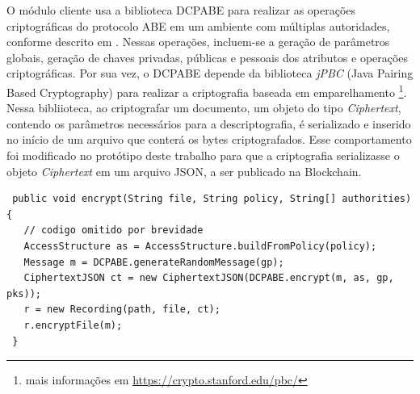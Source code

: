 \documentclass[a4paper,11pt]{article}
\begin{document}
O módulo cliente usa a biblioteca DCPABE para realizar as operações criptográficas do protocolo ABE em um ambiente com múltiplas autoridades, conforme descrito em \cite{Lewko2011}. Nessas operações, incluem-se a geração de parâmetros globais, geração de chaves privadas, públicas e pessoais dos atributos e operações criptográficas.
Por sua vez, o DCPABE depende da biblioteca \emph{jPBC} (Java Pairing Based Cryptography) \cite{DeCaro2011} para realizar a criptografia baseada em emparelhamento
\footnote{mais informações em \href{https://crypto.stanford.edu/pbc/}{https://crypto.stanford.edu/pbc/}}.
Nessa bibliioteca, ao criptografar um documento, um objeto do tipo \emph{Ciphertext}, contendo os parâmetros necessários para a descriptografia, é serializado e inserido no início de um arquivo que conterá os bytes criptografados. Esse comportamento foi modificado no protótipo deste trabalho para que a criptografia serializasse o objeto \emph{Ciphertext} em um arquivo JSON, a ser publicado na Blockchain.



\begin{lstlisting}
 public void encrypt(String file, String policy, String[] authorities) {
   // codigo omitido por brevidade
   AccessStructure as = AccessStructure.buildFromPolicy(policy);
   Message m = DCPABE.generateRandomMessage(gp);
   CiphertextJSON ct = new CiphertextJSON(DCPABE.encrypt(m, as, gp, pks));
   r = new Recording(path, file, ct);
   r.encryptFile(m);
 }
\end{lstlisting}
\end{document}
